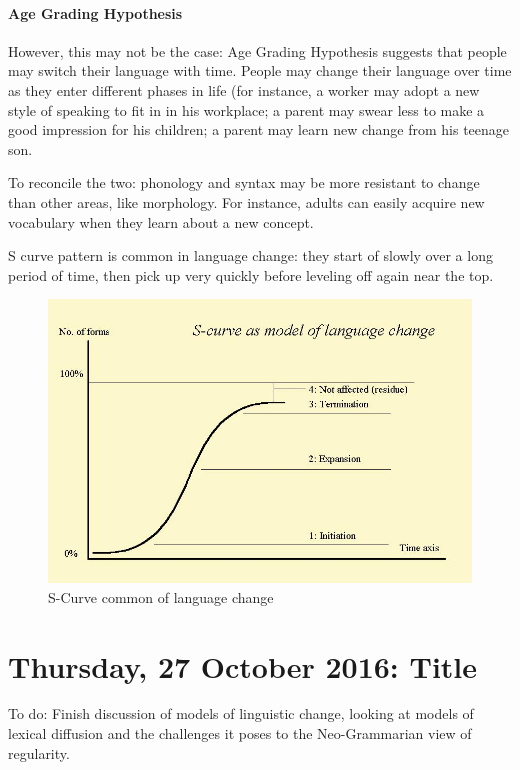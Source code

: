 \documentclass{exam}
\begin{document}
\paragraph{Age Grading Hypothesis} However, this may not be the case: Age Grading Hypothesis suggests that people may switch their language with time. People may change their language over time as they enter different phases in life (for instance, a worker may adopt a new style of speaking to fit in in his workplace; a parent may swear less to make a good impression for his children; a parent may learn new change from his teenage son.

To reconcile the two: phonology and syntax may be more resistant to change than other areas, like morphology. For instance, adults can easily acquire new vocabulary when they learn about a new concept. 

S curve pattern is common in language change: they start of slowly over a long period of time, then pick up very quickly before leveling off again near the top. 

\begin{figure} [h!]
    \centering
    \includegraphics[scale=.4]{images/s_curve.JPG}
    \caption{S-Curve common of language change}
    \label{fig:my_label}
\end{figure}



\section*{Thursday, 27 October 2016: Title}

To do: Finish discussion of models of linguistic change, looking at models of lexical diffusion and the challenges it poses to the Neo-Grammarian view of regularity. 
\end{document}
